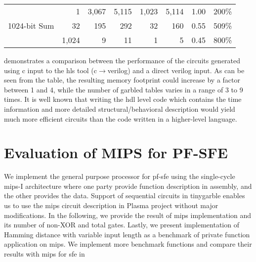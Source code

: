 \begin{table}
{\begin{tabular}{l|r||rr||rr||rr}
\multirow{3}{*}{1024-bit Sum}      & 1                                       & 3,067                       & 5,115                            & 1,023                       & 5,114                            & 1.00                    & 200\%                   \\
                                   & 32                                      & 195                         & 292                              & 32                          & 160                              & 0.55                    & 509\%                   \\
                                   & 1,024                                   & 9                           & 11                               & 1                           & 5                                & 0.45                    & 800\%
\end{tabular}
}
\end{table}

 demonstrates a comparison between the performance of the circuits generated using \gls{c} input to the \acrshort{hls} tool (\gls{c}$\rightarrow$\gls{verilog}) and a direct \gls{verilog} input.
As can be seen from the table, the resulting memory footprint could increase by a factor between 1 and 4, while the number of garbled tables varies in a range of 3 to 9 times.
It is well known that writing the \acrshort{hdl} level code which contains the time information and more detailed structural/behavioral description would yield much more efficient circuits than the code written in a higher-level language.

\section{Evaluation of MIPS for PF-SFE} \label{sec:eval-mips-pf-sfe}
We implement the general purpose processor for \acrshort{pf-sfe} using the single-cycle \gls{mips}-I architecture where one party provide function description in assembly, and the other provides the data.
Support of sequential circuits in \gls{tinygarble} enables us to use the \gls{mips} circuit description in Plasma project \cite{rhoads2006plasma} without major modifications.
In the following, we provide the result of \gls{mips} implementation and its number of non-XOR and total gates.
Lastly, we present implementation of Hamming distance with variable input length as a benchmark of private function application on \gls{mips}.
We implement more benchmark functions and compare their results with \gls{mips} for \gls{sfe} in 

